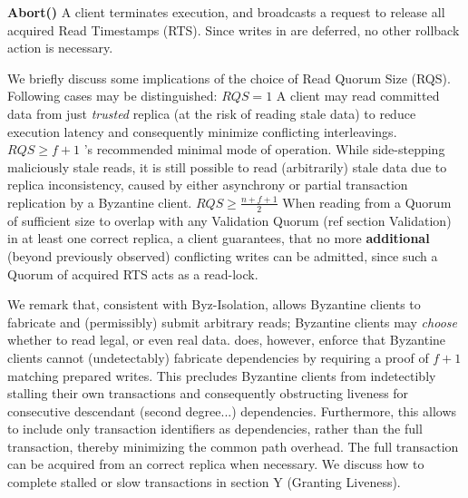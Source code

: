 \textbf{Abort()} A client terminates execution, and broadcasts a request to release all acquired Read Timestamps (RTS). Since writes in \sys are deferred, no other rollback action is necessary.


We briefly discuss some implications of the choice of Read Quorum Size (RQS). Following cases may be distinguished: \one \textbf{$RQS = 1$} A client may read committed data from just \textit{trusted} replica (at the risk of reading stale data) to reduce execution latency and consequently minimize conflicting interleavings. \two \textbf{$RQS \geq f+1$} \sys{}'s recommended minimal mode of operation. While side-stepping maliciously stale reads, it is still possible to read (arbitrarily) stale data due to replica inconsistency, caused by either asynchrony or partial transaction replication by a Byzantine client.
\three \textbf{$RQS \geq \frac{n+f+1}{2}$} When reading from a Quorum of sufficient size to overlap with any Validation Quorum (ref section Validation) in at least one correct replica, a client guarantees, that no more \textbf{additional} (beyond previously observed) conflicting writes can be admitted, since such a Quorum of acquired RTS acts as a read-lock. 

We remark that, consistent with Byz-Isolation, \sys allows Byzantine clients to fabricate and (permissibly) submit arbitrary reads; Byzantine clients may \textit{choose} whether to read legal, or even real data.  \sys does, however, enforce that Byzantine clients cannot (undetectably) fabricate dependencies by requiring a proof of $f+1$ matching prepared writes. This precludes Byzantine clients from indetectibly stalling their own transactions and consequently obstructing liveness for consecutive descendant (second degree...) dependencies.
Furthermore, this allows \sys to include only transaction identifiers as dependencies, rather than the full transaction, thereby minimizing the common path overhead. The full transaction can be acquired from an correct replica when necessary. We discuss how to complete stalled or slow transactions in section Y (Granting Liveness).




